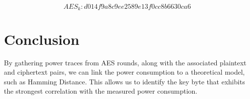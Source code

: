 \documentclass[12pt, letterpaper, oneside]{report}
\begin{document}
$$AES_k: d014f9a8c9ee2589e13f0cc8b6630ca6$$

\chapter{Conclusion}

By gathering power traces from AES rounds, along with the associated plaintext and ciphertext pairs, we can link the power consumption to a theoretical model, such as Hamming Distance. This allows us to identify the key byte that exhibits the strongest correlation with the measured power consumption. \\ 
\end{document}
